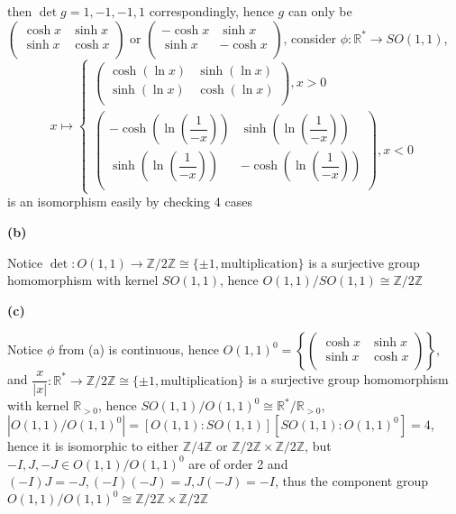 \documentclass[10pt]{article}
\newcommand{\<}[1]{\langle #1 \rangle}
\begin{document}
then $\det{g}=1,-1,-1,1$ correspondingly, hence $g$ can only be $\left( {\begin{array}{cc}
   \cosh{x} & \sinh x \\
   \sinh{x} & \cosh{x} \\
  \end{array} } \right)$ or $\left( {\begin{array}{cc}
   -\cosh{x} & \sinh{x} \\
   \sinh{x} & -\cosh{x} \\
  \end{array} } \right)$, consider $\phi:\mathbb{R}^*\rightarrow SO(1,1)$, 
  $$x\mapsto\begin{cases}
  \left( {\begin{array}{cc}
   \cosh{\left(\ln{x}\right)} & \sinh{\left(\ln{x}\right)} \\
   \sinh{\left(\ln{x}\right)} & \cosh{\left(\ln{x}\right)} \\
  \end{array} } \right), x>0\\
  \left( {\begin{array}{cc}
   -\cosh{\left(\ln{\left(\dfrac{1}{-x}\right)}\right)} & \sinh{\left(\ln{\left(\dfrac{1}{-x}\right)}\right)} \\
   \sinh{\left(\ln{\left(\dfrac{1}{-x}\right)}\right)} & -\cosh{\left(\ln{\left(\dfrac{1}{-x}\right)}\right)} \\
  \end{array} } \right), x<0
  \end{cases}$$
is an isomorphism easily by checking 4 cases \par
\textbf{(b)} \par
Notice $\det:O(1,1)\rightarrow\mathbb{Z}/2\mathbb{Z}\cong\{\pm1,\text{multiplication}\}$ is a surjective group homomorphism with kernel $SO(1,1)$, hence $O(1,1)/SO(1,1)\cong\mathbb{Z}/2\mathbb{Z}$ \par
\textbf{(c)} \par
Notice $\phi$ from (a) is continuous, hence $O(1,1)^0=\left\{\left( {\begin{array}{cc}
   \cosh{x} & \sinh x \\
   \sinh{x} & \cosh{x} \\
  \end{array} } \right)\right\}$, and $\dfrac{x}{|x|}:\mathbb{R}^*\rightarrow\mathbb{Z}/2\mathbb{Z}\cong\{\pm1,\text{multiplication}\}$ is a surjective group homomorphism with kernel $\mathbb{R}_{>0}$, hence $SO(1,1)/O(1,1)^0\cong\mathbb{R}^*/\mathbb{R}_{>0}$, $\left|O(1,1)/O(1,1)^0\right|=\left[O(1,1):SO(1,1)\right]\left[SO(1,1):O(1,1)^0\right]=4$, hence it is isomorphic to either $\mathbb{Z}/4\mathbb{Z}$  or $\mathbb{Z}/2\mathbb{Z}\times \mathbb{Z}/2\mathbb{Z}$, but $-I,J,-J\in O(1,1)/O(1,1)^0$ are of order 2 and $(-I)J=-J,(-I)(-J)=J,J(-J)=-I$, thus the component group $O(1,1)/O(1,1)^0\cong\mathbb{Z}/2\mathbb{Z}\times \mathbb{Z}/2\mathbb{Z}$ \par
\end{document}
